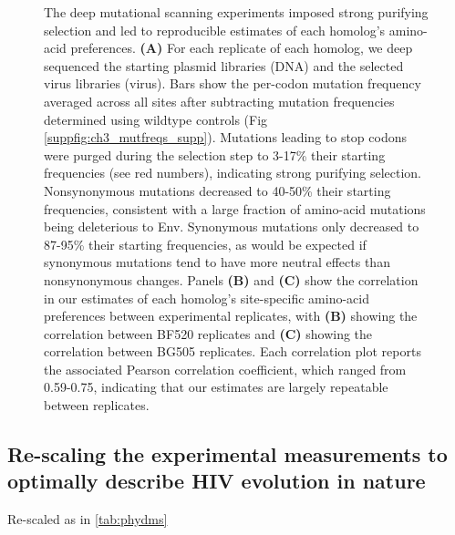 \documentclass[9pt,lineno]{elife}
\begin{document}
\begin{figure}
\caption{\label{fig:mutfreqs}
The deep mutational scanning experiments imposed strong purifying selection and led to reproducible estimates of each homolog's amino-acid preferences.
{\bf(A)} For each replicate of each homolog, we deep sequenced the starting plasmid libraries (DNA) and the selected virus libraries (virus).
Bars show the per-codon mutation frequency averaged across all sites after subtracting mutation frequencies determined using wildtype controls (Fig \ref{suppfig:ch3_mutfreqs_supp}).
Mutations leading to stop codons were purged during the selection step to 3-17\% their starting frequencies (see red numbers), indicating strong purifying selection.
Nonsynonymous mutations decreased to 40-50\% their starting frequencies, consistent with a large fraction of amino-acid mutations being deleterious to Env.
Synonymous mutations only decreased to 87-95\% their starting frequencies, as would be expected if synonymous mutations tend to have more neutral effects than nonsynonymous changes.
Panels {\bf(B)} and {\bf(C)} show the correlation in our estimates of each homolog's site-specific amino-acid preferences between experimental replicates, with {\bf(B)} showing the correlation between BF520 replicates and {\bf(C)} showing the correlation between BG505 replicates.
Each correlation plot reports the associated Pearson correlation coefficient, which ranged from 0.59-0.75, indicating that our estimates are largely repeatable between replicates.
}
\end{figure}


\subsection*{Re-scaling the experimental measurements to optimally describe HIV evolution in nature}

Re-scaled as in \ref{tab:phydms}
\end{document}
